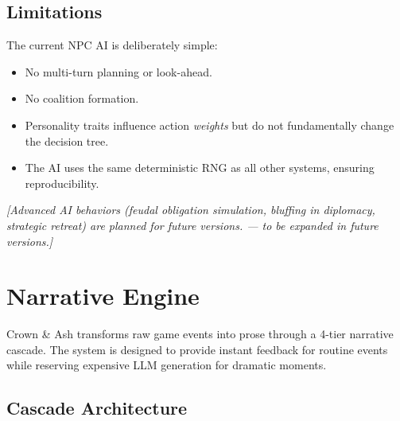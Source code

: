\documentclass[a4paper, 11pt]{article}
\newcommand{\placeholder}[1]{\textit{[#1 --- to be expanded in future versions.]}}
\begin{document}
\subsection{Limitations}

The current NPC AI is deliberately simple:

\begin{itemize}
  \item No multi-turn planning or look-ahead.
  \item No coalition formation.
  \item Personality traits influence action \emph{weights} but do not
    fundamentally change the decision tree.
  \item The AI uses the same deterministic RNG as all other systems, ensuring
    reproducibility.
\end{itemize}

\placeholder{Advanced AI behaviors (feudal obligation simulation, bluffing in
diplomacy, strategic retreat) are planned for future versions.}


\section{Narrative Engine}
\label{sec:narrative}

Crown \& Ash transforms raw game events into prose through a 4-tier narrative
cascade. The system is designed to provide instant feedback for routine events
while reserving expensive LLM generation for dramatic moments.

\subsection{Cascade Architecture}
\end{document}
